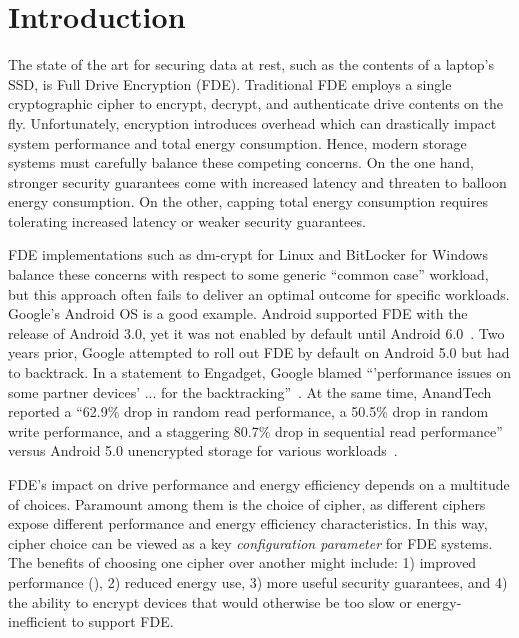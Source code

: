 \section{Introduction}\label{sec:introduction}

The state of the art for securing data at rest, such as the contents of a
laptop's SSD, is Full Drive Encryption (FDE). Traditional FDE employs a single
cryptographic cipher to encrypt, decrypt, and authenticate drive contents on the
fly. Unfortunately, encryption introduces overhead which can drastically impact
system performance and total energy consumption. Hence, modern storage systems
must carefully balance these competing concerns. On the one hand, stronger
security guarantees come with increased latency and threaten to balloon energy
consumption. On the other, capping total energy consumption requires tolerating
increased latency or weaker security guarantees.

FDE implementations such as dm-crypt for Linux and BitLocker for Windows balance
these concerns with respect to some generic ``common case'' workload, but
this approach often fails to deliver an optimal outcome for specific workloads.
Google's Android OS is a good example. Android supported FDE with the
release of Android 3.0, yet it was not enabled by default until Android
6.0~\cite{android-M-mobile-motivation}. Two years prior, Google attempted to
roll out FDE by default on Android 5.0 but had to backtrack. In a statement to
Engadget, Google blamed ``'performance issues on some partner devices' ... for
the backtracking''~\cite{google-engadget}. At the same time, AnandTech reported
a ``62.9\% drop in random read performance, a 50.5\% drop in random write
performance, and a staggering 80.7\% drop in sequential read performance''
versus Android 5.0 unencrypted storage for various
workloads~\cite{android-M-mobile-motivation-2}.

FDE's impact on drive performance and energy efficiency depends on a multitude
of choices. Paramount among them is the choice of cipher, as different ciphers
expose different performance and energy efficiency characteristics. In this way,
cipher choice can be viewed as a key \emph{configuration parameter} for FDE
systems. The benefits of choosing one cipher over another might include: 1)
improved performance (), 2) reduced energy
use, 3) more useful security guarantees, and 4) the ability to encrypt devices
that would otherwise be too slow or energy-inefficient to support FDE.

